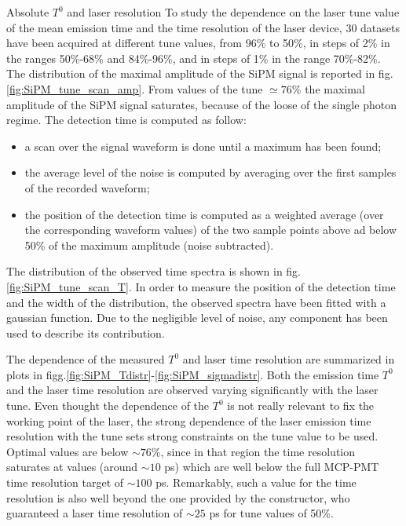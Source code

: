\documentclass[a4paper,11pt]{article}
\begin{document}
\begin{subsection}{Absolute $T^0$ and laser resolution}
To study the dependence on the laser tune value of the mean emission time and the time resolution of the laser device, 30 datasets have been acquired at different tune values, from 96\% to 50\%, in steps of 2\% in the ranges 50\%-68\% and 84\%-96\%, and in steps of 1\% in the range 70\%-82\%.
The distribution of the maximal amplitude of the SiPM signal is reported in fig.\ref{fig:SiPM_tune_scan_amp}. From values of the tune $\simeq 76\%$ the maximal amplitude of the SiPM signal saturates, because of the loose of the single photon regime. The detection time is computed as follow:
\begin{itemize}
\item a scan over the signal waveform is done until a maximum has been found;
\item the average level of the noise is computed by averaging over the first samples of the recorded waveform;
\item the position of the detection time is computed as a weighted average (over the corresponding waveform values) of the two sample points above ad below 50\% of the maximum amplitude (noise subtracted). 
\end{itemize}

The distribution of the observed time spectra is shown in fig.\ref{fig:SiPM_tune_scan_T}. In order to measure the position of the detection time and the width of the distribution, the observed spectra have been fitted with a gaussian function. Due to the negligible level of noise, any component has been used to describe its contribution.  

The dependence of the measured $T^0$ and laser time resolution are summarized in plots in figg.\ref{fig:SiPM_Tdistr}-\ref{fig:SiPM_sigmadistr}. Both the emission time $T^0$ and the laser time resolution are observed varying significantly with the laser tune. Even thought the dependence of the $T^0$ is not really relevant to fix the working point of the laser, the strong dependence of the laser emission time resolution with the tune sets strong constraints on the tune value to be used. Optimal values are below $\sim 76\%$, since in that region the time resolution saturates at values (around $\sim 10$ ps) which are well below the full MCP-PMT time resolution target of $\sim 100$ ps. Remarkably, such a value for the time resolution is also well beyond the one provided by the constructor, who guaranteed a laser time resolution of $\sim 25$ ps for tune values of 50\%. 


\end{subsection}
\end{document}
